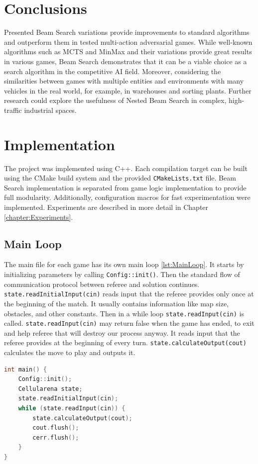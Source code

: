 \documentclass[shortabstract, mgr, english]{iithesis}
\begin{document}
\chapter{Conclusions}
Presented Beam Search variations provide improvements to standard algorithms and outperform them in tested multi-action adversarial games. While well-known algorithms such as MCTS and MinMax and their variations provide great results in various games, Beam Search demonstrates that it can be a viable choice as a search algorithm in the competitive AI field. Moreover, considering the similarities between games with multiple entities and environments with many vehicles in the real world, for example, in warehouses and sorting plants. Further research could explore the usefulness of Nested Beam Search in complex, high-traffic industrial spaces.

\appendix
\chapter{Implementation}
\label{chapter:Implementation}
The project was implemented using C++. Each compilation target can be built using the CMake build system and the provided \texttt{CMakeLists.txt} file. Beam Search implementation is separated from game logic implementation to provide full modularity. Additionally, configuration macros for fast experimentation were implemented. Experiments are described in more detail in Chapter \ref{chapter:Experiments}.
\section{Main Loop}
The main file for each game has its own main loop \ref{lst:MainLoop}. It starts by initializing parameters by calling \texttt{Config::init()}. Then the standard flow of communication protocol between referee and solution continues. \texttt{state.readInitialInput(cin)} reads input that the referee provides only once at the beginning of the match. It usually contains information like map size, obstacles, and other constants.
Then in a while loop \texttt{state.readInput(cin)} is called. \texttt{state.readInput(cin)} may return false when the game has ended, to exit and help referee that will destroy our process anyway. It reads input that the referee provides at the beginning of every turn. \texttt{state.calculateOutput(cout)} calculates the move to play and outputs it.

\begin{lstlisting}[language=C++, caption=Main Loop, label={lst:MainLoop}]
int main() {
    Config::init();
    Cellularena state;
    state.readInitialInput(cin);
    while (state.readInput(cin)) {
        state.calculateOutput(cout);
        cout.flush();
        cerr.flush();
    }
}
\end{lstlisting}
\end{document}
